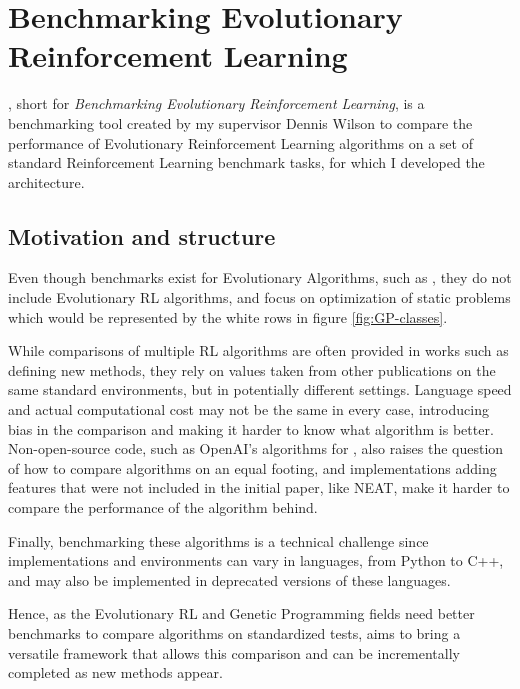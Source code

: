 \chapter{Benchmarking Evolutionary Reinforcement Learning}
\label{chap:berl}

, short for \textit{Benchmarking Evolutionary Reinforcement Learning}, is a benchmarking tool created by my supervisor Dennis Wilson to compare the performance of Evolutionary Reinforcement Learning algorithms on a set of standard Reinforcement Learning benchmark tasks, for which I developed the architecture. 

\section{Motivation and structure}


Even though benchmarks exist for Evolutionary Algorithms, such as , they do not include Evolutionary RL algorithms, and focus on optimization of static problems which would be represented by the white rows in figure \ref{fig:GP-classes}. 

While comparisons of multiple RL algorithms are often provided in works such as \cite{CGP} defining new methods, they rely on values taken from other publications on the same standard environments, but in potentially different settings. Language speed and actual computational cost may not be the same in every case, introducing bias in the comparison and making it harder to know what algorithm is better.\\
Non-open-source code, such as OpenAI's algorithms for \dota, also raises the question of how to compare algorithms on an equal footing, and implementations adding features that were not included in the initial paper, like NEAT, make it harder to compare the performance of the algorithm behind.

Finally, benchmarking these algorithms is a technical challenge since implementations and environments can vary in languages, from Python to C++, and may also be implemented in deprecated versions of these languages.

Hence, as the Evolutionary RL and Genetic Programming fields need better benchmarks \cite{GP-benchmark} to compare algorithms on standardized tests, \berl aims to bring a versatile framework that allows this comparison and can be incrementally completed as new methods appear.

